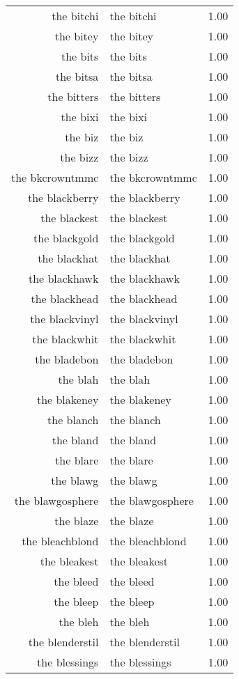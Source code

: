 \begin{table}[ht]
\begin{tabular}{rlr}
  the bitchi & the bitchi & 1.00 \\ 
  the bitey & the bitey & 1.00 \\ 
  the bits & the bits & 1.00 \\ 
  the bitsa & the bitsa & 1.00 \\ 
  the bitters & the bitters & 1.00 \\ 
  the bixi & the bixi & 1.00 \\ 
  the biz & the biz & 1.00 \\ 
  the bizz & the bizz & 1.00 \\ 
  the bkcrowntmmc & the bkcrowntmmc & 1.00 \\ 
  the blackberry & the blackberry & 1.00 \\ 
  the blackest & the blackest & 1.00 \\ 
  the blackgold & the blackgold & 1.00 \\ 
  the blackhat & the blackhat & 1.00 \\ 
  the blackhawk & the blackhawk & 1.00 \\ 
  the blackhead & the blackhead & 1.00 \\ 
  the blackvinyl & the blackvinyl & 1.00 \\ 
  the blackwhit & the blackwhit & 1.00 \\ 
  the bladebon & the bladebon & 1.00 \\ 
  the blah & the blah & 1.00 \\ 
  the blakeney & the blakeney & 1.00 \\ 
  the blanch & the blanch & 1.00 \\ 
  the bland & the bland & 1.00 \\ 
  the blare & the blare & 1.00 \\ 
  the blawg & the blawg & 1.00 \\ 
  the blawgosphere & the blawgosphere & 1.00 \\ 
  the blaze & the blaze & 1.00 \\ 
  the bleachblond & the bleachblond & 1.00 \\ 
  the bleakest & the bleakest & 1.00 \\ 
  the bleed & the bleed & 1.00 \\ 
  the bleep & the bleep & 1.00 \\ 
  the bleh & the bleh & 1.00 \\ 
  the blenderstil & the blenderstil & 1.00 \\ 
  the blessings & the blessings & 1.00 \\ 

\end{tabular}
\end{table}
